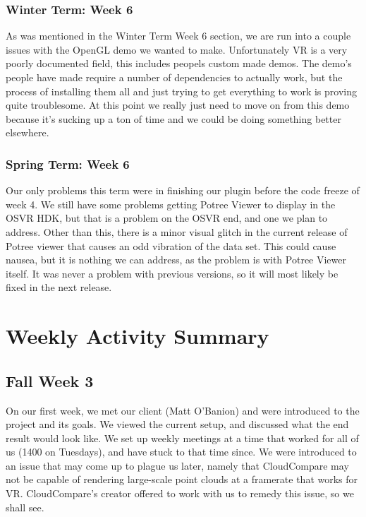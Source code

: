 \documentclass{article}
\begin{document}
\subsubsection{Winter Term: Week 6}

As was mentioned in the Winter Term Week 6 section, we are run into a couple issues with the OpenGL demo we wanted to make.
Unfortunately VR is a very poorly documented field, this includes peopels custom made demos.
The demo's people have made require a number of dependencies to actually work, but the process of installing them all and just trying to get everything to work is proving quite troublesome.
At this point we really just need to move on from this demo because it's sucking up a ton of time and we could be doing something better elsewhere.

\subsubsection{Spring Term: Week 6}

Our only problems this term were in finishing our plugin before the code freeze of week 4. 
We still have some problems getting Potree Viewer to display in the OSVR HDK, but that is a problem on the OSVR end, and one we plan to address. 
Other than this, there is a minor visual glitch in the current release of Potree viewer that causes an odd vibration of the data set. 
This could cause nausea, but it is nothing we can address, as the problem is with Potree Viewer itself. 
It was never a problem with previous versions, so it will most likely be fixed in the next release. 

\section{Weekly Activity Summary}
\subsection{Fall Week 3}

On our first week, we met our client (Matt O'Banion) and were introduced to the project and its goals. 
We viewed the current setup, and discussed what the end result would look like. We set up weekly meetings at a time that worked for all of us (1400 on Tuesdays), and have stuck to that time since. 
We were introduced to an issue that may come up to plague us later, namely that CloudCompare may not be capable of rendering large-scale point clouds at a framerate that works for VR. 
CloudCompare's creator offered to work with us to remedy this issue, so we shall see.
\end{document}
